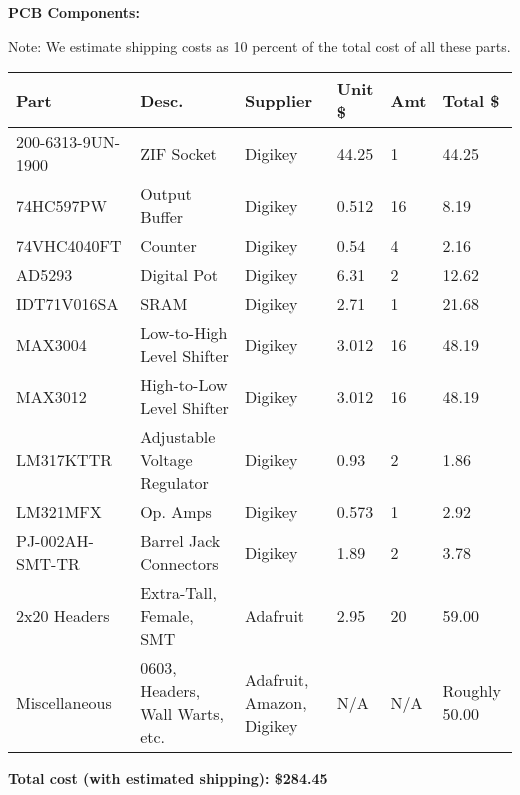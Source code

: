 \begin{flushleft}
\textbf{PCB Components:}

Note: We estimate shipping costs as 10 percent of the total cost of all these parts.
\end{flushleft}
\begin{center}
    \begin{tabular}{| p{} | p{} | p{} | p{} | p{} | p{} |}
    \hline
    Part & Desc. & Supplier & Unit \$ & Amt & Total \$ \\ \hline
    200-6313-9UN-1900 & ZIF Socket & Digikey & 44.25 & 1 & 44.25 \\ \hline
    74HC597PW & Output Buffer & Digikey & 0.512 & 16 & 8.19 \\ \hline
    74VHC4040FT & Counter & Digikey & 0.54 & 4 & 2.16 \\ \hline
    AD5293 & Digital Pot & Digikey & 6.31 & 2 & 12.62 \\ \hline
    IDT71V016SA & SRAM & Digikey & 2.71 & 1 & 21.68 \\ \hline
    MAX3004 & Low-to-High Level Shifter & Digikey & 3.012 & 16 & 48.19 \\ \hline
    MAX3012 & High-to-Low Level Shifter & Digikey & 3.012 & 16 & 48.19 \\ \hline
    LM317KTTR & Adjustable Voltage Regulator & Digikey & 0.93 & 2 & 1.86 \\ \hline
    LM321MFX & Op. Amps & Digikey & 0.573 & 1 & 2.92 \\ \hline
    PJ-002AH-SMT-TR & Barrel Jack Connectors & Digikey & 1.89 & 2 & 3.78 \\ \hline
    2x20 Headers & Extra-Tall, Female, SMT & Adafruit & 2.95 & 20 & 59.00 \\ \hline
    Miscellaneous & 0603, Headers, Wall Warts, etc. & Adafruit, Amazon, Digikey & N/A & N/A & Roughly 50.00 \\ \hline
    \end{tabular}
\end{center}
\begin{flushleft}
\textbf{Total cost (with estimated shipping): \$284.45}
\end{flushleft}

\newpage